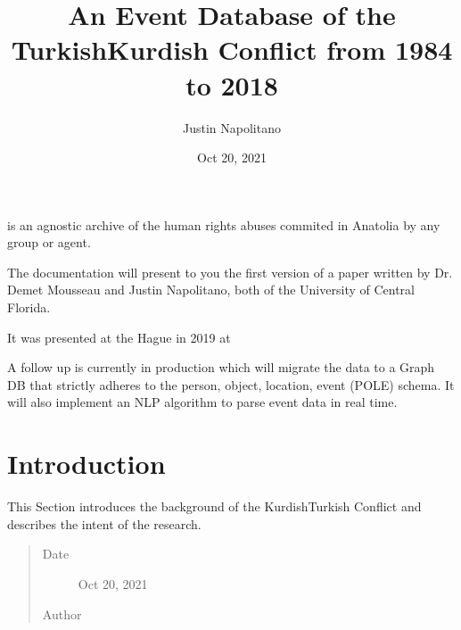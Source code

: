 \documentclass[letterpaper,10pt,english]{sphinxmanual}
\title{An Event Database of the Turkish\sphinxhyphen{}Kurdish Conflict from 1984 to 2018}
\date{Oct 20, 2021}
\author{Justin Napolitano}
\begin{document}
\pagestyle{empty}
\sphinxmaketitle
\pagestyle{plain}
\sphinxtableofcontents
\pagestyle{normal}
\label{\detokenize{index::doc}}
\begin{sphinxShadowBox}

\sphinxAtStartPar
{} is an agnostic archive of the human rights abuses commited in Anatolia by any group or agent.
\end{sphinxShadowBox}

\sphinxAtStartPar
The documentation will present to you the first version of a paper written by Dr. Demet Mousseau and Justin Napolitano, both of the University of Central Florida.

\sphinxAtStartPar
It was presented at the Hague in 2019 at 

\sphinxAtStartPar
A follow up is currently in production which will migrate the data to a Graph DB that strictly adheres to the person, object, location, event (POLE) schema.  It will also implement an NLP algorithm to parse event data in real time.




\chapter{Introduction}
\label{\detokenize{introduction:introduction}}\label{\detokenize{introduction:introduction-chapter}}\label{\detokenize{introduction::doc}}
\begin{sphinxShadowBox}

\sphinxAtStartPar
This Section introduces the background of the Kurdish\sphinxhyphen{}Turkish Conflict and describes the intent of the research.
\begin{quote}\begin{description}
\item[{Date}] \leavevmode
\sphinxAtStartPar
Oct 20, 2021

\item[{Author}] \leavevmode
\sphinxAtStartPar
{}

\end{description}\end{quote}
\end{sphinxShadowBox}
\end{document}
